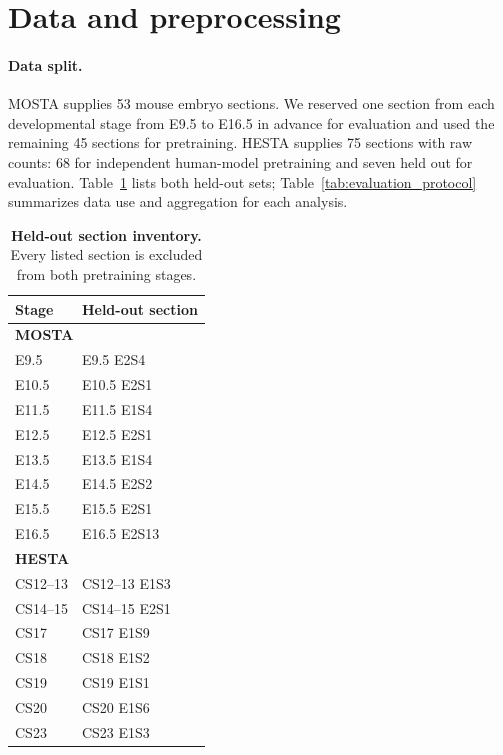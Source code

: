 \section{Data and preprocessing}
\label{app:preprocessing}

\paragraph{Data split.}
MOSTA supplies 53 mouse embryo sections. We reserved one section from each developmental stage from E9.5 to E16.5 in advance for evaluation and used the remaining 45 sections for pretraining. HESTA supplies 75 sections with raw counts: 68 for independent human-model pretraining and seven held out for evaluation. Table~\ref{tab:heldout-inventory} lists both held-out sets; Table~\ref{tab:evaluation_protocol} summarizes data use and aggregation for each analysis.

\begin{table}[!htbp]
\centering\small
\caption{\textbf{Held-out section inventory.} Every listed section is excluded from both pretraining stages.}
\label{tab:heldout-inventory}
\begin{tabular}{ll}
\toprule
Stage & Held-out section \\
\midrule
\multicolumn{2}{l}{\textbf{MOSTA}} \\
E9.5 & E9.5 E2S4 \\
E10.5 & E10.5 E2S1 \\
E11.5 & E11.5 E1S4 \\
E12.5 & E12.5 E2S1 \\
E13.5 & E13.5 E1S4 \\
E14.5 & E14.5 E2S2 \\
E15.5 & E15.5 E2S1 \\
E16.5 & E16.5 E2S13 \\
\midrule
\multicolumn{2}{l}{\textbf{HESTA}} \\
CS12--13 & CS12--13 E1S3 \\
CS14--15 & CS14--15 E2S1 \\
CS17 & CS17 E1S9 \\
CS18 & CS18 E1S2 \\
CS19 & CS19 E1S1 \\
CS20 & CS20 E1S6 \\
CS23 & CS23 E1S3 \\
\bottomrule
\end{tabular}
\end{table}

